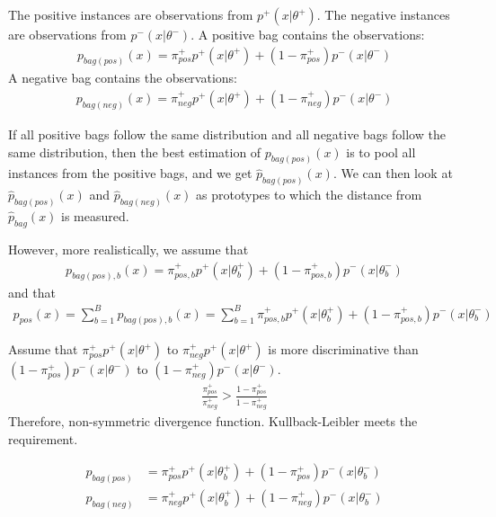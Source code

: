 The positive instances are observations from $p^+(x|\theta^+)$. 
The negative instances are observations from $p^-(x|\theta^-)$. 
A positive bag contains the observations:
\begin{align}
  p_{bag(pos)}(x) = \pi_{pos}^+ p^+(x|\theta^+) + (1-\pi_{pos}^+) p^-(x|\theta^-)
\end{align}
A negative bag contains the observations:
\begin{align}
  p_{bag(neg)}(x) = \pi_{neg}^+ p^+(x|\theta^+) + (1-\pi_{neg}^+) p^-(x|\theta^-)
\end{align}

If all positive bags follow the same distribution and all negative bags follow the same distribution, then the best estimation of $p_{bag(pos)}(x)$ is to pool all instances from the positive bags, and we get $\hat{p}_{bag(pos)}(x)$.
We can then look at $\hat{p}_{bag(pos)}(x)$ and $\hat{p}_{bag(neg)}(x)$ as prototypes to which the distance from $\hat{p}_{bag}(x)$ is measured.

However, more realistically, we assume that 
\begin{align}
  p_{bag(pos),b}(x) = \pi_{pos,b}^+ p^+(x|\theta^+_b) + (1-\pi_{pos,b}^+) p^-(x|\theta^-_b)
\end{align}
and that 
\begin{align}
  p_{pos}(x) = \sum_{b=1}^B p_{bag(pos),b}(x) = \sum_{b=1}^B \pi_{pos,b}^+ p^+(x|\theta^+_b) + (1-\pi_{pos,b}^+) p^-(x|\theta^-_b)
\end{align}


Assume that $\pi_{pos}^+ p^+(x|\theta^+)$ to $\pi_{neg}^+ p^+(x|\theta^+)$ is more discriminative than $(1-\pi_{pos}^+) p^-(x|\theta^-)$
to $(1-\pi_{neg}^+) p^-(x|\theta^-)$. 
\begin{align}
  \frac{\pi_{pos}^+}{\pi_{neg}^+} > \frac{1-\pi_{pos}^+}{1-\pi_{neg}^+} 
\end{align}
Therefore, non-symmetric divergence function. 
Kullback-Leibler meets the requirement.

\begin{align}
  p_{bag(pos)} & = \pi_{pos}^+ p^+(x|\theta_b^+) + (1-\pi_{pos}^+) p^-(x|\theta_b^-) \\
  p_{bag(neg)} & = \pi_{neg}^+ p^+(x|\theta_b^+) + (1-\pi_{neg}^+) p^-(x|\theta_b^-)
\end{align}

